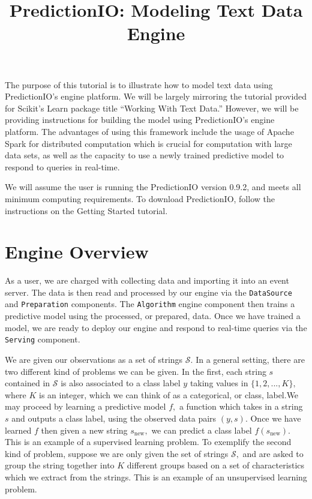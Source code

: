 \documentclass[a4paper,12pt]{article}
\renewcommand{\bf}[1]{\textbf{#1}}
\renewcommand{\tt}[1]{\texttt{#1}}
\newcommand{\3}{\left}
\newcommand{\4}{\right}
\renewcommand{\-}[1]{{}^{-#1}}
\begin{document}
\title{\vspace{-1.5 cm}\bf{PredictionIO: Modeling Text Data Engine}}
\author{\vspace{-2cm}}
\date{}
\maketitle


The purpose of this tutorial is to illustrate how to model text data using PredictionIO's engine platform. We will be largely mirroring the tutorial provided for Scikit's Learn package title \enquote{Working With Text Data.} However, we will be providing instructions for building the model using PredictionIO's engine platform. The advantages of using this framework include the usage of Apache Spark for distributed computation which is crucial for computation with large data sets, as well as the capacity to use a newly trained predictive model to respond to queries in real-time. 

We will assume the user is running the PredictionIO version 0.9.2, and meets all minimum computing requirements. To download PredictionIO, follow the instructions on the Getting Started tutorial.

\section*{Engine Overview}

As a user, we are charged with collecting data and importing it into an event server. The data is then read and processed by our engine via the \tt{DataSource} and \tt{Preparation} components. The \tt{Algorithm} engine component then trains a predictive model using the processed, or prepared, data. Once we have trained a model, we are ready to deploy our engine and respond to real-time queries via the \tt{Serving} component. 

We are given our observations as a set of strings $\mathcal{S}.$ In a general setting, there are two different kind of problems we can be given. In the first, each string $s$ contained in $\mathcal{S}$ is also associated to a class label $y$ taking values in $\{1, 2, ..., K\},$ where $K$ is an integer, which we can think of as a categorical, or class, label.We may proceed by learning a predictive model $f,$ a function which takes in a string $s$ and outputs a class label, using the observed data pairs $(y, s).$ Once we have learned $f$ then given a new string $s_\text{new},$ we can predict a class label $f(s_\text{new}).$ This is an example of a supervised learning problem. To exemplify the second kind of problem, suppose we are only given the set of strings $\mathcal {S},$ and are asked to group the string together into $K$ different groups based on a set of characteristics which we extract from the strings. This is an example of an unsupervised learning problem. 
\end{document}
